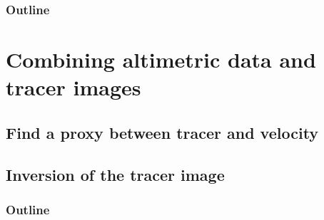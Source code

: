 \documentclass[compress,slidescentered,notes=show]{beamer}
\begin{document}
\begin{frame}
\end{frame}

\begin{frame}
  \frametitle{Outline}
  \tableofcontents%
\end{frame}

\section[Method]{Combining altimetric data and tracer images}

	\subsection[proxy FSLE]{Find a proxy between tracer and velocity}
\begin{frame}
\end{frame}

\begin{frame}
\end{frame}

	\subsection[Inversion]{Inversion of the tracer image}
\begin{frame}
\end{frame}

\begin{frame}
\end{frame}

\begin{frame}
  \frametitle{Outline}
  \tableofcontents%
\end{frame}
\end{document}
